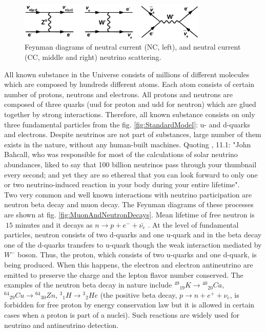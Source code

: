 \begin{figure}
\caption{Feynman diagrams of neutral current (NC, left), and neutral current (CC, middle and right) neutrino scattering.}
\label{fig:NuScattering}
\centering
\includegraphics[width=0.80\textwidth, keepaspectratio=true]{figs/neutrinoScattering.png}
\end{figure}


All known substance in the Universe consists of millions of different molecules which are composed by hundreds different atoms. Each atom consists of certain number of protons, neutrons and electrons. All protons and neutrons are composed of three quarks (uud for proton and udd for neutron) which are glued together by strong interactions. Therefore, all known substance consists on only three fundamental particles from the fig. \ref{fig:StandardModel}: u- and d-quarks and electrons. Despite neutrinos are not part of substances, large number of them exists in the nature, without any human-built machines. Quoting \cite{ref_Griffiths}, 11.1: "John Bahcall, who was responsible for most of the calculations of solar neutrino abundances, liked to say that 100 billion neutrinos pass through your thumbnail every second; and yet they are so ethereal that you can look forward to only one or two neutrino-induced reaction in your body during your entire lifetime".\\
Two very common and well known interactions with neutrino participation are neutron beta decay and muon decay. The Feynman diagrams of these processes are shown at fig. \ref{fig:MuonAndNeutronDecays}. Mean lifetime of free neutron is $~15$ minutes and it decays as $n \rightarrow p + e^- + \bar{{\nu}_e} $ \cite{ref_PDG}. At the level of fundamental particles, neutron consists of two d-quarks and one u-quark and in the beta decay one of the d-quarks transfers to u-quark though the weak interaction mediated by $W^- $ boson. Thus, the proton, which consists of two u-quarks and one d-quark, is being produced. When this happens, the electron and electron antineutrino are emitted to preserve the charge and the lepton flavor number conserved. The examples of the neutron beta decay in nature include ${^{49}}{_{19}}K \rightarrow {^{40}}{_{20}}Ca$, ${^{64}}{_{29}}Cu \rightarrow {^{64}}{_{30}}Zn$, ${^3}{_1}H \rightarrow {^3}{_2}He$ \cite{ref_Griffiths} (the positive beta decay,  $p \rightarrow n + e^+ + {\nu}_e $, is forbidden for free proton by energy conservation law but it is allowed in certain cases when a proton is part of a nuclei). Such reactions are widely used for neutrino and antineutrino detection.\\
